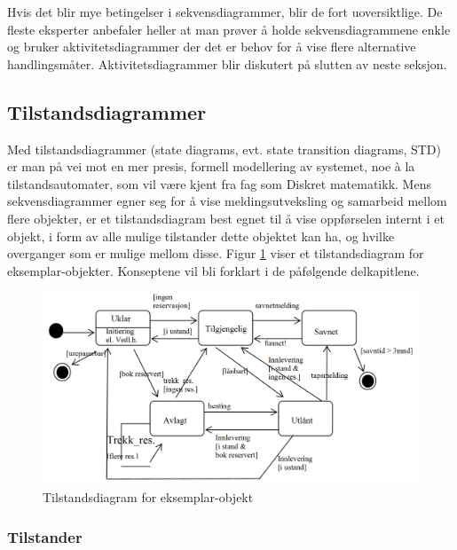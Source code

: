 Hvis det blir mye betingelser i sekvensdiagrammer, blir de fort uoversiktlige. De fleste eksperter anbefaler heller at man prøver å holde sekvensdiagrammene enkle og bruker aktivitetsdiagrammer der det er behov for å vise flere alternative handlingsmåter. Aktivitetsdiagrammer blir diskutert på slutten av neste seksjon.

\subsection{Tilstandsdiagrammer}

Med tilstandsdiagrammer (state diagrams, evt. state transition diagrams, STD) er man på vei mot en mer presis, formell modellering av systemet, noe à la tilstandsautomater, som vil være kjent fra fag som Diskret matematikk. Mens sekvensdiagrammer egner seg for å vise meldingsutveksling og samarbeid mellom flere objekter, er et tilstandsdiagram best egnet til å vise oppførselen internt i et objekt, i form av alle mulige tilstander dette objektet kan ha, og hvilke overganger som er mulige mellom disse.
Figur \ref{fig:sequence-diagram-for-specimen-object} viser et tilstandsdiagram for eksemplar-objekter. Konseptene vil bli forklart i de påfølgende delkapitlene.

\begin{figure}[H]
    \centering
    \includegraphics[scale=0.35]{resources/sequence-diagram-for-specimen-object.PNG}
    \caption{Tilstandsdiagram for eksemplar-objekt}
    \label{fig:sequence-diagram-for-specimen-object}
\end{figure}

\subsubsection{Tilstander}

